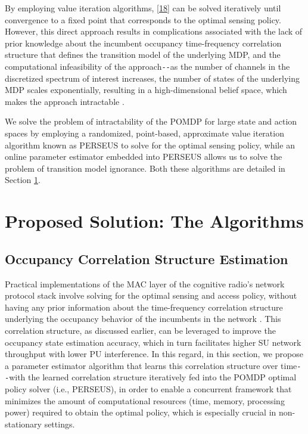 By employing value iteration algorithms, \eqref{18} can be solved iteratively until convergence to a fixed point that corresponds to the optimal sensing policy. However, this direct approach results in complications associated with the lack of prior knowledge about the incumbent occupancy time-frequency correlation structure that defines the transition model of the underlying MDP, and the computational infeasibility of the approach\texttt{-{}-}as the number of channels in the discretized spectrum of interest increases, the number of states of the underlying MDP scales exponentially, resulting in a high-dimensional belief space, which makes the approach intractable \cite{WCL:paper}.

We solve the problem of intractability of the POMDP for large state and action spaces by employing a randomized, point-based, approximate value iteration algorithm known as PERSEUS \cite{WCL:13} to solve for the optimal sensing policy, while an online parameter estimator embedded into PERSEUS allows us to solve the problem of transition model ignorance. Both these algorithms are detailed in Section \ref{II}.
\section{Proposed Solution: The Algorithms}\label{II}
\subsection{Occupancy Correlation Structure Estimation}\label{II.I}
Practical implementations of the MAC layer of the cognitive radio's network protocol stack involve solving for the optimal sensing and access policy, without having any prior information about the time-frequency correlation structure underlying the occupancy behavior of the incumbents in the network \cite{WCL:paper}. This correlation structure, as discussed earlier, can be leveraged to improve the occupancy state estimation accuracy, which in turn facilitates higher SU network throughput with lower PU interference. In this regard, in this section, we propose a parameter estimator algorithm that learns this correlation structure over time\texttt{-{}-}with the learned correlation structure iteratively fed into the POMDP optimal policy solver (i.e., PERSEUS), in order to enable a concurrent framework that minimizes the amount of computational resources (time, memory, processing power) required to obtain the optimal policy, which is especially crucial in non-stationary settings.

